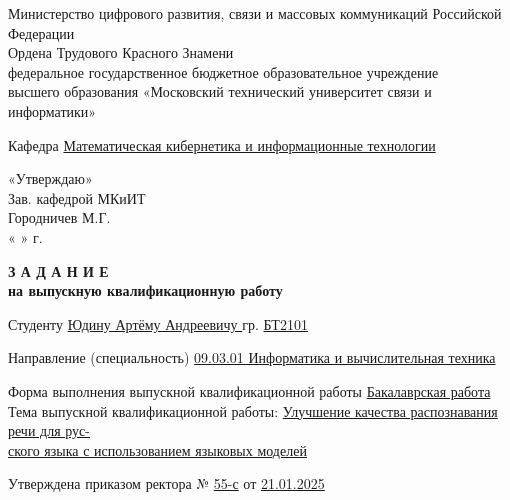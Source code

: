 
{
\newpage
\fontsize{12pt}{12pt}\selectfont
\begin{center}
    \noindent Министерство цифрового развития, связи и массовых коммуникаций Российской Федерации\\Ордена Трудового Красного Знамени \\ 
федеральное государственное бюджетное образовательное учреждение\\
высшего образования 
«Московский технический университет связи и информатики»
\end{center}
\noindent Кафедра \underline{Математическая кибернетика и информационные технологии} \hfill
\vspace{0.1cm}
\noindent
\begin{minipage}[t]{6cm}
«Утверждаю»\\
Зав. кафедрой  МКиИТ \\
Городничев М.Г.\\
« \hrulefill »  г.
\end{minipage}

\vspace{0.5cm}

\begin{center}
\textbf{З А Д А Н И Е}\\
\textbf{на выпускную квалификационную работу}
\end{center}

\vspace{0.3cm}

\noindent Студенту \underline{Юдину Артёму Андреевичу \hfill } гр. \underline{БТ2101}

\vspace{0.2cm}

\noindent Направление (специальность) \underline{09.03.01 Информатика и вычислительная техника}

\vspace{0.2cm}

\noindent Форма выполнения выпускной квалификационной работы \underline{Бакалаврская работа} \\
Тема выпускной квалификационной работы: \underline{Улучшение качества распознавания речи для рус-}\\\underline{ского языка с использованием языковых моделей}


\noindent Утверждена приказом ректора № \underline{55-с} \hfill от \underline{21.01.2025}

\vspace{0.2cm}

}

